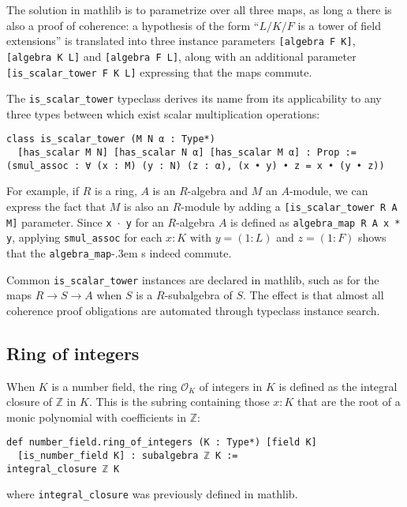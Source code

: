 \documentclass[a4paper,USenglish,cleveref, autoref, thm-restate]{lipics-v2021}
\newcommand{\lean}[1]{\texttt{#1}\xspace} %
\newcommand*{\OK}[1][K]{\mathcal{O}_{#1}}
\newcommand{\mathlib}{\textsf{mathlib}\xspace}
\newcommand{\Q}{\mathbb{Q}}
\newcommand{\Z}{\mathbb{Z}}
\begin{document}
The solution in \mathlib is to parametrize over all three maps, as long a there is also a proof of coherence:
a hypothesis of the form ``$L / K / F$ is a tower of field extensions'' is translated into three instance parameters \lean{[algebra F K]}, \lean{[algebra K L]} and \lean{[algebra F L]},
along with an additional parameter \lean{[is\_scalar\_tower F K L]} expressing that the maps commute.

The \lean{is\_scalar\_tower} typeclass derives its name from its applicability to any three types between which exist scalar multiplication operations:
\begin{lstlisting}
class is_scalar_tower (M N α : Type*)
  [has_scalar M N] [has_scalar N α] [has_scalar M α] : Prop :=
(smul_assoc : ∀ (x : M) (y : N) (z : α), (x • y) • z = x • (y • z))
\end{lstlisting}
For example, if $R$ is a ring, $A$ is an $R$-algebra and $M$ an $A$-module, we can express the fact that $M$ is also an $R$-module by adding a \lean{[is\_scalar\_tower R A M]} parameter.
Since \lean{x~$\cdot$~y} for an $R$-algebra $A$ is defined as \lean{algebra\_map R A x * y}, applying \lean{smul\_assoc} for each $x : K$ with $y = (1 : L)$ and $z = (1 : F)$ shows that the \lean{algebra\_map}\kern-.3em s indeed commute.

Common \lean{is\_scalar\_tower} instances are declared in \mathlib,
such as for the maps $R \to S \to A$ when $S$ is a $R$-subalgebra of $S$.
The effect is that almost all coherence proof obligations are automated through typeclass instance search.

\subsection{Ring of integers} \label{sec:ring-of-integers}

When $K$ is a number field, the ring $\OK$ of integers in $K$ is defined as the integral closure of $\Z$ in $K$.
This is the subring containing those $x : K$ that are the root of a monic polynomial with coefficients in $\Z$:
\begin{lstlisting}
def number_field.ring_of_integers (K : Type*) [field K]
  [is_number_field K] : subalgebra ℤ K :=
integral_closure ℤ K
\end{lstlisting}
where \lean{integral\_closure} was previously defined in \mathlib.
\end{document}
